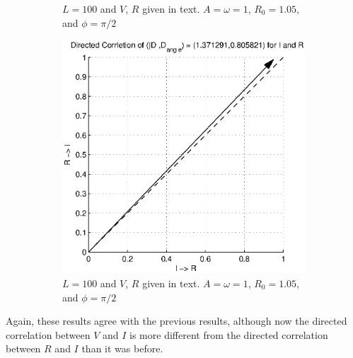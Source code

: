 \documentclass[a4paper,11pt]{article}
\begin{document}
\begin{figure}[h!t]
\begin{subfigure}[b]{0.25\textwidth}
\caption{$L = 100$ and $V$, $R$ given in text. $A=\omega=1$, $R_0=1.05$, and $\phi=\pi/2$}
\end{subfigure}
\begin{subfigure}[b]{0.25\textwidth}
\label{fig:RL_Rsin3VsinCCMIR}
\includegraphics[scale=0.4]{graphics/RL_Rsin3VsinCCMIR.eps}
\caption{$L = 100$ and $V$, $R$ given in text. $A=\omega=1$, $R_0=1.05$, and $\phi=\pi/2$}
\end{subfigure}
\caption{}
\end{figure}
Again, these results agree with the previous results, although now the directed correlation between $V$ and $I$ is more different from the directed correlation between $R$ and $I$ than it was before.
\end{document}
